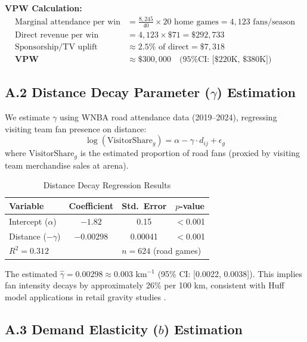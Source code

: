 \documentclass{mcmthesis}
\begin{document}
\textbf{VPW Calculation:}
\begin{align}
\text{Marginal attendance per win} &= \frac{8{,}245}{40} \times 20 \text{ home games} = 4{,}123 \text{ fans/season} \\
\text{Direct revenue per win} &= 4{,}123 \times \$71 = \$292{,}733 \\
\text{Sponsorship/TV uplift} &\approx 2.5\% \text{ of direct} = \$7{,}318 \\
\textbf{VPW} &\approx \$300{,}000 \quad \text{(95\% CI: [\$220K, \$380K])}
\end{align}

\subsection*{A.2 Distance Decay Parameter ($\gamma$) Estimation}

We estimate $\gamma$ using WNBA road attendance data (2019--2024), regressing visiting team fan presence on distance:
\begin{equation}
\log(\text{VisitorShare}_g) = \alpha - \gamma \cdot d_{ij} + \epsilon_g
\end{equation}
where $\text{VisitorShare}_g$ is the estimated proportion of road fans (proxied by visiting team merchandise sales at arena).

\begin{table}[H]
\centering
\caption{Distance Decay Regression Results}
\small
\begin{tabular}{lccc}
\toprule
\textbf{Variable} & \textbf{Coefficient} & \textbf{Std.\ Error} & \textbf{$p$-value} \\
\midrule
Intercept ($\alpha$) & $-1.82$ & 0.15 & $<$0.001 \\
Distance ($-\gamma$) & $-0.00298$ & 0.00041 & $<$0.001 \\
\midrule
\multicolumn{2}{l}{$R^2 = 0.312$} & \multicolumn{2}{l}{$n = 624$ (road games)} \\
\bottomrule
\end{tabular}
\end{table}

The estimated $\hat{\gamma} = 0.00298 \approx 0.003$ km$^{-1}$ (95\% CI: [0.0022, 0.0038]). This implies fan intensity decays by approximately 26\% per 100 km, consistent with Huff model applications in retail gravity studies \cite{huff1964}.

\subsection*{A.3 Demand Elasticity ($b$) Estimation}
\end{document}
